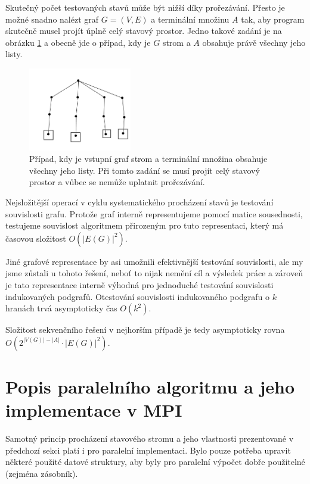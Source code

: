 \documentclass[12pt]{article}
\theoremstyle{definition}
\begin{document}
Skutečný počet testovaných stavů může být nižší díky prořezávání. Přesto je možné snadno nalézt graf $G=(V,E)$ a terminální množinu $A$ tak, aby program skutečně musel projít úplně celý stavový prostor. Jedno takové zadání je na obrázku \ref{imgWorst} a obecně jde o případ, kdy je
$G$ strom a $A$ obsahuje právě všechny jeho listy.
\begin{figure}[ht]
	\centering
	\includegraphics[width=0.4\textwidth]{obr/worst.png}
	\caption{Případ, kdy je vstupní graf strom a terminální množina obsahuje všechny jeho listy. Při tomto zadání se musí
		projít celý stavový prostor a vůbec se nemůže uplatnit prořezávání.}
	\label{imgWorst}
\end{figure}

Nejsložitější operací v cyklu systematického procházení stavů je testování souvislosti
grafu. Protože graf interně representujeme pomocí matice sousednosti, testujeme souvislost algoritmem přirozeným pro tuto representaci, který má časovou složitost $O(|E(G)|^2)$.

Jiné grafové representace by asi umožnili efektivnější testování souvislosti, ale my jsme zůstali u tohoto řešení, neboť to nijak nemění cíl a výsledek práce a zároveň je tato representace interně výhodná pro jednoduché testování souvislosti indukovaných podgrafů. Otestování
souvislosti indukovaného podgrafu o $k$ hranách trvá asymptoticky čas $O(k^2)$.

Složitost sekvenčního řešení v nejhorším případě je tedy asymptoticky rovna $O(2^{|V(G)|-|A|}\cdot |E(G)|^2)$.




\section{Popis paralelního algoritmu a jeho implementace v MPI}
Samotný princip procházení stavového stromu a jeho vlastnosti prezentované v předchozí sekci
platí i pro paralelní implementaci. Bylo pouze potřeba upravit některé použité datové struktury, aby
byly pro paralelní výpočet dobře použitelné (zejména zásobník).
\end{document}
